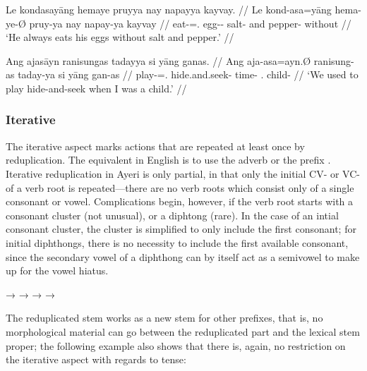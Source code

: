 \pex
\a\label{ex:habcns}\begingl
	\gla Le kondasayāng hemaye pruyya nay napayya kayvay. //
	\glb Le kond-asa=yāng hema-ye-Ø pruy-ya nay napay-ya kayvay //
	\glc \PatTI{} eat-\Hab{}=\TsgM{}.\Aarg{} egg-\Pl{}-\Top{} salt-\Loc{} 
		and pepper-\Loc{} without //
	\glft `He always eats his eggs without salt and pepper.' //
\endgl

\a\label{ex:habvwl}\begingl
	\gla Ang ajasāyn ranisungas tadayya si yāng ganas. //
	\glb Ang aja-asa=ayn.Ø ranisung-as taday-ya si yāng gan-as //
	\glc \AgtT{} play-\Hab{}=\Fpl{}.\Top{} hide.and.seek-\Parg{} 
		time-\Loc{} \Rel{} \Fsg{}.\Aarg{} child-\Parg{} //
	\glft `We used to play hide-and-seek when I was a child.' //
\endgl

\xe



\subsubsection{Iterative}

The iterative aspect marks actions that are repeated at least once by 
reduplication. The equivalent in English is to use the adverb  or the 
prefix . Iterative reduplication in Ayeri is only partial, in that only 
the initial CV- or VC- of a verb root is repeated---there are no verb roots 
which consist only of a single consonant or vowel. Complications begin, 
however, if the verb root starts with a consonant cluster (not unusual), or a 
diphtong (rare). In the case of an intial consonant cluster, the cluster is 
simplified to only include the first consonant; for initial diphthongs, there 
is no necessity to include the first available consonant, since the secondary 
vowel of a diphthong can by itself act as a semivowel to make up for the vowel 
hiatus.

\pex
	\a {}
		→ 
	\a {}
		→ 
	\a {}
		→ 
	\a {}
		→ 
\xe

The reduplicated stem works as a new stem for other prefixes, that is, no 
morphological material can go between the reduplicated part and the lexical 
stem proper; the following example also shows that there is, again, no 
restriction on the iterative aspect with regards to tense:

